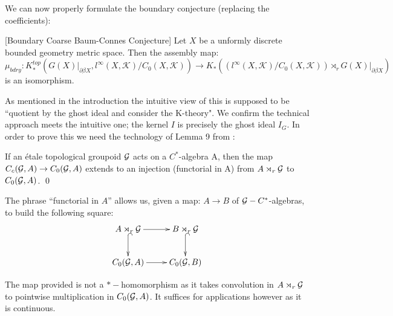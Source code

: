 We can now properly formulate the boundary conjecture (replacing the coefficients):

\begin{conj}\label{MC:S1} [Boundary Coarse Baum-Connes Conjecture]
Let $X$ be a unformly discrete bounded geometry metric space. Then the assembly map:
\begin{equation*}
\mu_{bdry}:K_{*}^{top}(G(X)|_{\partial\beta X}, l^{\infty}(X,\mathcal{K})/C_{0}(X,\mathcal{K})) \rightarrow K_{*}((l^{\infty}(X,\mathcal{K})/C_{0}(X,\mathcal{K}))\rtimes_{r}G(X)|_{\partial\beta X})
\end{equation*}
is an isomorphism.
\end{conj}

As mentioned in the introduction the intuitive view of this is supposed to be ``quotient by the ghost ideal and consider the K-theory". We confirm the technical approach meets the intuitive one; the kernel $I$ is precisely the ghost ideal $I_{G}$. In order to prove this we need the technology of Lemma 9 from \cite{MR1911663}:

\begin{lemma}\label{Lem:Lemma9}
If an \'etale topological groupoid $\mathcal{G}$ acts on a $C^{*}$-algebra A, then the map $C_{c}(\mathcal{G},A) \rightarrow C_{0}(\mathcal{G},A)$ extends to an injection (functorial in A) from $A\rtimes_{r} \mathcal{G}$ to $C_{0}(\mathcal{G},A)$. \qed
\end{lemma}

\begin{remark}
The phrase ``functorial in $A$'' allows us, given a map: $A \rightarrow B$ of $\mathcal{G}-C^{*}$-algebras, to build the following square:
\begin{equation*}
\xymatrix{A\rtimes_{r} \G \ar@{->}[r] \ar@{^{(}->}[d] &B \rtimes_{r} \G \ar@{^{(}->}[d]\\
C_{0}(\G ,A)\ar@{->}[r] &   C_{0}(\G ,B)
}
\end{equation*}
\end{remark}

\begin{remark}
The map provided is not a $*-$homomorphism as it takes convolution in $A\rtimes_{r} \mathcal{G}$ to pointwise multiplication in $C_{0}(\mathcal{G},A)$. It suffices for applications however as it is continuous.
\end{remark}

